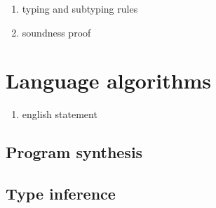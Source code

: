 \documentclass[sigplan,screen]{acmart}
\begin{document}
\begin{enumerate}
  \item typing and subtyping rules 
  \item soundness proof 
\end{enumerate}

\section{Language algorithms}
\begin{enumerate}
  \item english statement 
\end{enumerate}
\subsection{Program synthesis}
\subsection{Type inference}
\end{document}
